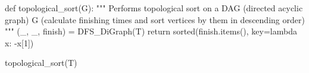 \begin{sageCell}
def topological_sort(G):
    """
    Performs topological sort on a DAG (directed acyclic graph) G
    (calculate finishing times and sort vertices by them in
    descending order)
    """
    (_, _, finish) = DFS_DiGraph(T)
    return sorted(finish.items(), key=lambda x: -x[1])
\end{sageCell}

\begin{sageCell}
    topological_sort(T)
\end{sageCell}
\begin{outCell}
\end{outCell}
